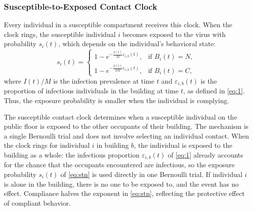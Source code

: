 \documentclass[11pt]{article}
\theoremstyle{definition}
\theoremstyle{plain}
\begin{document}
\subsubsection{Susceptible-to-Exposed Contact Clock}
\label{sec:sus}

Every individual in a susceptible compartment receives this clock. When the clock rings, the susceptible individual $i$ becomes exposed to the virus with probability $s_i(t)$, which depends on the individual's behavioral state:
\begin{equation}\label{eq:stn}
s_i(t) =
\begin{cases}
1-e^{-\frac{I(t)}{M}\varepsilon_{i,b}(t)}, & \text{if } B_i(t)=N,\\[6pt]
1-e^{-\frac{I(t)}{2M}\varepsilon_{i,b}(t)}, & \text{if } B_i(t)=C,
\end{cases}
\end{equation}
where $I(t)/M$ is the infection prevalence at time $t$ and $\varepsilon_{i,b}(t)$ is the proportion of infectious individuals in the building at time $t$, as defined in \eqref{eq:1}. Thus, the exposure probability is smaller when the individual is complying.




The susceptible contact clock determines when a susceptible individual on the public floor is exposed to the other occupants of their building. The mechanism is a single Bernoulli trial and does not involve selecting an individual contact. When the clock rings for individual $i$ in building $b$, the individual is exposed to the building as a whole: the infectious proportion $\varepsilon_{i,b}(t)$ of \eqref{eq:1} already accounts for the chance that the occupants encountered are infectious, so the exposure probability $s_i(t)$ of \eqref{eq:stn} is used directly in one Bernoulli trial. If individual $i$ is alone in the building, there is no one to be exposed to, and the event has no effect. Compliance halves the exponent in \eqref{eq:stn}, reflecting the protective effect of compliant behavior.

\end{document}
